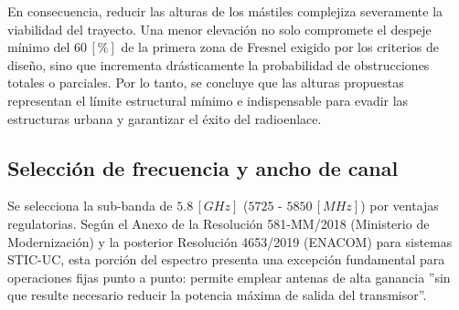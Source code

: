 En consecuencia, reducir las alturas de los mástiles complejiza severamente la viabilidad del trayecto. Una menor elevación no solo compromete el despeje mínimo del $60 \, [\%]$ de la primera zona de Fresnel exigido por los criterios de diseño, sino que incrementa drásticamente la probabilidad de obstrucciones totales o parciales. Por lo tanto, se concluye que las alturas propuestas representan el límite estructural mínimo e indispensable para evadir las estructuras urbana y garantizar el éxito del radioenlace.



\subsection{Selección de frecuencia y ancho de canal}
\label{sec_2.7}
Se selecciona la sub-banda de $5.8 \, [GHz]$ ($5725$ - $5850 \, [MHz]$) por ventajas regulatorias. Según el Anexo de la Resolución 581-MM/2018 (Ministerio de Modernización) y la posterior Resolución 4653/2019 (ENACOM) para sistemas STIC-UC, esta porción del espectro presenta una excepción fundamental para operaciones fijas punto a punto: permite emplear antenas de alta ganancia ''sin que resulte necesario reducir la potencia máxima de salida del transmisor''. 

